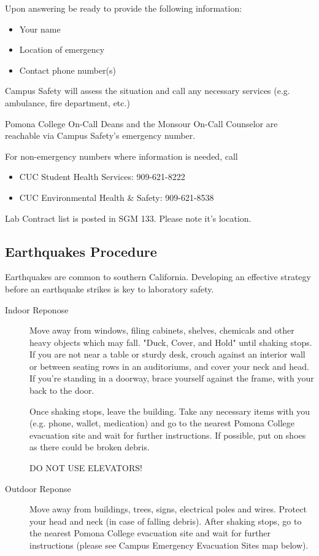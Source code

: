 \documentclass[12pt]{../SOP4_alpha}\usepackage[]{graphicx}\usepackage[]{color}
\begin{document}
\NP Upon answering be ready to provide the following information:

\begin{itemize}
  \item Your name
  \item Location of emergency
  \item Contact phone number(s)
\end{itemize}

\NP Campus Safety will assess the situation and call any necessary services (e.g. ambulance, fire department, etc.)

\NP Pomona College On-Call Deans and the Monsour On-Call Counselor are reachable via Campus Safety's emergency number. 

\NP For non-emergency numbers where information is needed, call 
 
\begin{itemize}
  \item CUC Student Health Services: 909-621-8222
  \item CUC Environmental Health \& Safety: 909-621-8538 
\end{itemize}

\NP Lab Contract list is posted in SGM 133. Please note it's location.

\subsection*{Earthquakes Procedure} 

\NP Earthquakes are common to southern California. Developing an effective strategy before an earthquake strikes is key to laboratory safety.

\begin{description}
  \item[Indoor Reponose] Move away from windows, filing cabinets, shelves, chemicals and other heavy objects which may fall. "Duck, Cover, and Hold" until shaking stops. If you are not near a table or sturdy desk, crouch against an interior wall or between seating rows in an auditoriums, and cover your neck and head. If you’re standing in a doorway, brace yourself against the frame, with your back to the door.

Once shaking stops, leave the building. Take any necessary items with you (e.g. phone, wallet, medication) and go to the nearest Pomona College evacuation site and wait for further instructions. If possible, put on shoes as there could be broken debris. 

DO NOT USE ELEVATORS!

\item[Outdoor Reponse] Move away from buildings, trees, signs, electrical poles and wires.
Protect your head and neck (in case of falling debris).
After shaking stops, go to the nearest Pomona College evacuation site and wait for further instructions (please see Campus Emergency Evacuation Sites map below).

\end{description}
	
\end{document}
